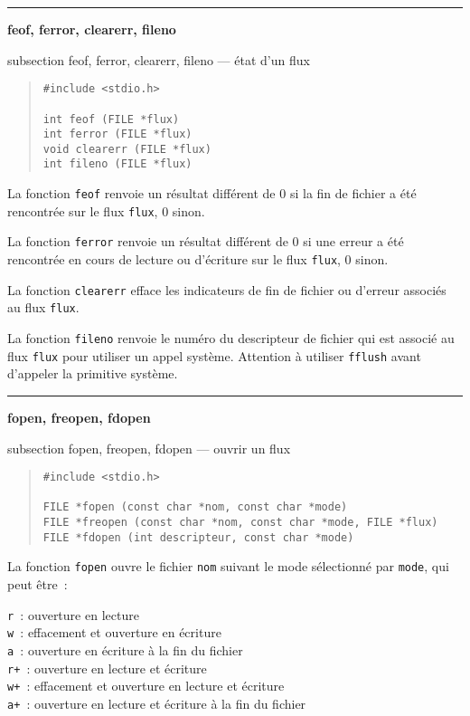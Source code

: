 \documentclass [twoside] {report}
\newcommand {\primitive} [1]
    {
	{\large \bf #1}
	\addcontentsline {toc} {subsection} {#1}
    }
\newcommand {\separation}
    {
	\vspace {7mm}
	\nopagebreak
	\hrule
    }
\begin{document}
\separation
\primitive {feof, ferror, clearerr, fileno} --- état d'un flux

\begin {quote}
\begin {verbatim}
#include <stdio.h>

int feof (FILE *flux)
int ferror (FILE *flux)
void clearerr (FILE *flux)
int fileno (FILE *flux)
\end{verbatim}
\end {quote}

La fonction {\tt feof} renvoie un résultat différent de 0 si
la fin de fichier a été rencontrée sur le flux {\tt flux},
0 sinon.

La fonction {\tt ferror} renvoie un résultat différent de 0 si
une erreur a été rencontrée en cours de lecture ou
d'écriture sur le flux {\tt flux}, 0 sinon.

La fonction {\tt clearerr} efface les indicateurs de fin de
fichier ou d'erreur associés au flux {\tt flux}.

La fonction {\tt fileno} renvoie le numéro du descripteur de
fichier qui est associé au flux {\tt flux} pour utiliser un
appel système. Attention à utiliser {\tt fflush} avant d'appeler
la primitive système.


\separation
\primitive {fopen, freopen, fdopen} --- ouvrir un flux

\begin {quote}
\begin {verbatim}
#include <stdio.h>

FILE *fopen (const char *nom, const char *mode)
FILE *freopen (const char *nom, const char *mode, FILE *flux)
FILE *fdopen (int descripteur, const char *mode)
\end{verbatim}
\end {quote}

La fonction {\tt fopen} ouvre le fichier {\tt nom} suivant le
mode sélectionné par {\tt mode}, qui peut être~: \par
{\tt r  }: ouverture en lecture \\
{\tt w  }: effacement et ouverture en écriture \\
{\tt a  }: ouverture en écriture à la fin du fichier \\
{\tt r+ }: ouverture en lecture et écriture \\
{\tt w+ }: effacement et ouverture en lecture et écriture \\
{\tt a+ }: ouverture en lecture et écriture à la fin du fichier 
\end{document}
